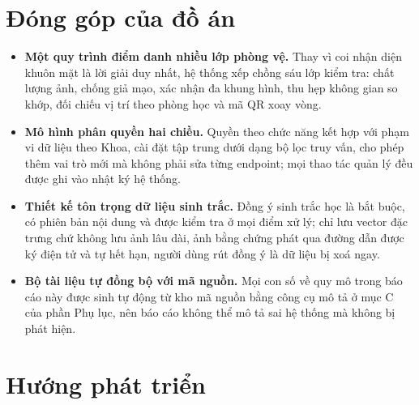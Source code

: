 \section{Đóng góp của đồ án}

\begin{itemize}[leftmargin=1.6em, itemsep=3pt]
  \item \textbf{Một quy trình điểm danh nhiều lớp phòng vệ.} Thay vì coi
        nhận diện khuôn mặt là lời giải duy nhất, hệ thống xếp chồng sáu lớp
        kiểm tra: chất lượng ảnh, chống giả mạo, xác nhận đa khung hình, thu
        hẹp không gian so khớp, đối chiếu vị trí theo phòng học và mã QR xoay
        vòng.
  \item \textbf{Mô hình phân quyền hai chiều.} Quyền theo chức năng kết hợp
        với phạm vi dữ liệu theo Khoa, cài đặt tập trung dưới dạng bộ lọc
        truy vấn, cho phép thêm vai trò mới mà không phải sửa từng endpoint;
        mọi thao tác quản lý đều được ghi vào nhật ký hệ thống.
  \item \textbf{Thiết kế tôn trọng dữ liệu sinh trắc.} Đồng ý sinh trắc học
        là bắt buộc, có phiên bản nội dung và được kiểm tra ở mọi điểm xử lý;
        chỉ lưu vector đặc trưng chứ không lưu ảnh lâu dài, ảnh bằng chứng
        phát qua đường dẫn được ký điện tử và tự hết hạn, người dùng rút đồng
        ý là dữ liệu bị xoá ngay.
  \item \textbf{Bộ tài liệu tự đồng bộ với mã nguồn.} Mọi con số về quy mô
        trong báo cáo này được sinh tự động từ kho mã nguồn bằng công cụ mô
        tả ở mục C của phần Phụ lục, nên báo cáo không thể mô tả sai hệ
        thống mà không bị phát hiện.
\end{itemize}

\section{Hướng phát triển}

